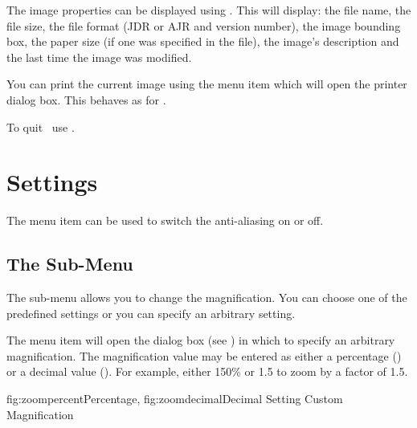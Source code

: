 The image properties can be displayed using
. This will display: the file name,
the file size, the file format (\gls{JDR} or \gls{AJR} and version number), the
image bounding box, the paper size (if one was specified in the
file), the image's description and the last time the image was
modified.


You can print the current image using the  menu
item which will open the printer dialog box. This behaves as for
\FlowframTk.


To quit \JDRView\ use .


\chapter{Settings}
\label{sec:settings}


The  menu item can be used to switch
the anti-aliasing on or off.

\section{The  Sub-Menu}
\label{sec:zoommenu}


The  sub-menu allows you to change
the magnification. You can choose one of the predefined
settings%
or you can specify an arbitrary setting.


The  menu item will open the
 dialog box (see ) in
which to specify an arbitrary magnification.  The magnification
value may be entered as either a percentage
() or a decimal value
(). For example, either 150\% or 1.5 to
zoom by a factor of 1.5. 

 {
   {fig:zoompercent}{}{Percentage},
   {fig:zoomdecimal}{}{Decimal}
 }
 {Setting Custom Magnification}


